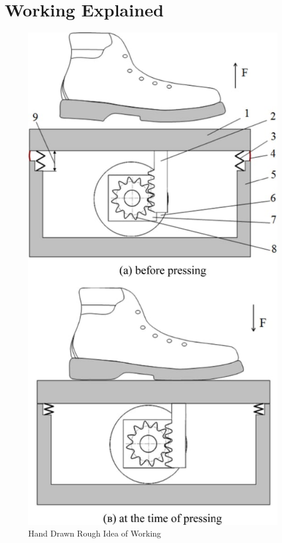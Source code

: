 \documentclass[11pt]{article}
\begin{document}
\section{Working Explained}
\begin{figure}[H]
	\centering
	\includegraphics[scale=0.5]{working 1.jpg}
	\caption{Hand Drawn Rough Idea of Working}
\end{figure}
\end{document}
